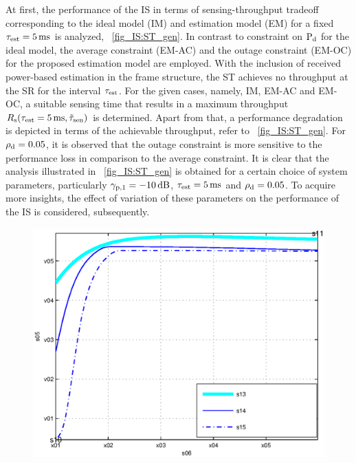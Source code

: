 {At first, the performance of the IS in terms of sensing-throughput tradeoff corresponding to the ideal model (IM) and estimation model (EM) for a fixed $\tau_{\text{est}} = \SI{5}{ms}$ is analyzed,  \figurename~\ref{fig_IS:ST_gen}. In contrast to constraint on $\text{P}_{\text{d}}$ for the ideal model, the average constraint (EM-AC) and the outage constraint (EM-OC) for the proposed estimation model are employed. With the inclusion of received power-based estimation in the frame structure, the ST achieves no throughput at the SR for the interval $\tau_{\text{est}}$. For the given cases, namely, IM, EM-AC and EM-OC, a suitable sensing time that results in a maximum throughput $R_{\text{s}}(\tau_{\text{est}} = \SI{5}{ms},\tilde{\tau}_{\text{sen}})$ is determined. Apart from that, a performance degradation is depicted in terms of the achievable throughput, refer to \figurename~\ref{fig_IS:ST_gen}. For $\rho_{\text{d}} = 0.05$, it is observed that the outage constraint is more sensitive to the performance loss in comparison to the average constraint. It is clear that the analysis illustrated in \figurename~\ref{fig_IS:ST_gen} is obtained for a certain choice of system parameters, particularly ${\gamma}_{\text{p,1}} = -\SI{10}{dB}$, $\tau_{\text{est}} = \SI{5}{ms}$ and $\rho_{\text{d}} = 0.05$. To acquire more insights, the effect of variation of these parameters on the performance of the IS is considered, subsequently. 

\begin{figure}[!ht]


\centering
\includegraphics[width= \figscale]{figures/fig_opt_thr_vs_SNR_AWGN}
\caption{}
\label{fig_IS:optT_snr}
\end{figure}

}
